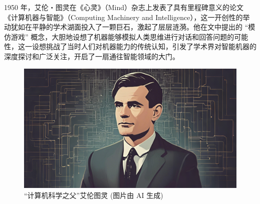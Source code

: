 1950 年，艾伦・图灵在《心灵》（Mind）杂志上发表了具有里程碑意义的论文《计算机器与智能》（Computing Machinery and Intelligence），这一开创性的举动犹如在平静的学术湖面投入了一颗巨石，激起了层层涟漪。他在文中提出的 “模仿游戏” 概念，大胆地设想了机器能够模拟人类思维进行对话和回答问题的可能性，这一设想挑战了当时人们对机器能力的传统认知，引发了学术界对智能机器的深度探讨和广泛关注，开启了一扇通往智能领域的大门。
\begin{figure}[htbp]
    \centering
    \includegraphics[width=0.75\linewidth]{image/1/Turing.png}
    \caption{“计算机科学之父”艾伦图灵 (图片由 AI 生成)}
\end{figure}


